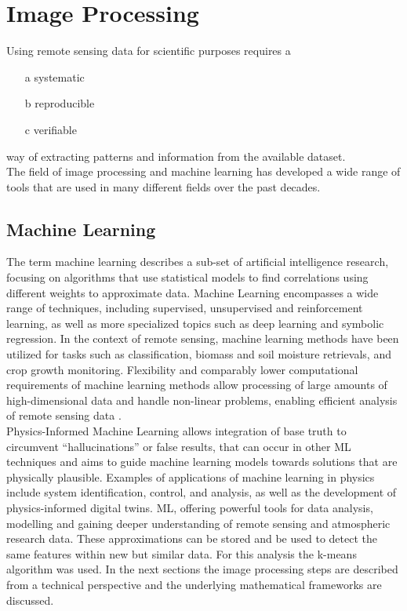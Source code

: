 \documentclass[12pt,a4paper, english,twoside]{scrartcl}
\begin{document}
\section{Image Processing}\label{sec:imgProcessing}
    Using remote sensing data for scientific purposes requires a 
    \begin{itemize} 
      \item[a] systematic
      \item[b] reproducible
      \item[c] verifiable 
    \end{itemize}%
    way of extracting patterns and information from the available dataset.\\
    The field of image processing and machine learning has developed a wide range of tools that are used in many different fields over the past decades. 
    \subsection{Machine Learning}\label{sec:ml}
      The term machine learning describes a sub-set of artificial intelligence research, focusing on algorithms that use statistical models to find correlations using different weights to approximate data.
      Machine Learning encompasses a wide range of techniques, including supervised, unsupervised and reinforcement learning, as well as more specialized topics such as deep learning and symbolic regression\autocite{Rodrigues2023}. 
      In the context of remote sensing, machine learning methods have been utilized for tasks such as classification, biomass and soil moisture retrievals, and crop growth monitoring.
      Flexibility and comparably lower computational requirements of machine learning methods allow processing of large amounts of high-dimensional data and handle non-linear problems, enabling efficient analysis of remote sensing data \autocite{Maxwell2018}.\\
      Physics-Informed Machine Learning allows integration of base truth to circumvent ``hallucinations'' or false results, that can occur in other \gls{ML} techniques and aims to guide machine learning models towards solutions that are physically plausible.
      Examples of applications of machine learning in physics include system identification, control, and analysis, as well as the development of physics-informed digital twins. 
      \gls{ML}, offering powerful tools for data analysis, modelling and gaining deeper understanding of remote sensing and atmospheric research data.
      These approximations can be stored and be used to detect the same features within new but similar data.
      For this analysis the k-means algorithm was used. 
      In the next sections the image processing steps are described from a technical perspective and the underlying mathematical frameworks are discussed.
\end{document}
